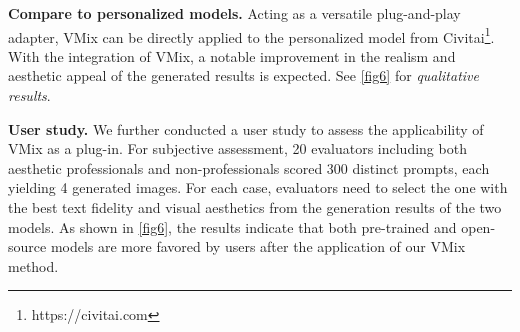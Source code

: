 \noindent \textbf{Compare to personalized models.} Acting as a versatile plug-and-play adapter, VMix can be directly applied to the personalized model from Civitai\footnote{https://civitai.com}. With the integration of VMix, a notable improvement in the realism and aesthetic appeal of the generated results is expected. See \cref{fig6} for \textit{qualitative results}.

\noindent \textbf{User study.} We further conducted a user study to assess the applicability of VMix as a plug-in. For subjective assessment, 20 evaluators including both aesthetic professionals and non-professionals scored 300 distinct prompts, each yielding 4 generated images. For each case, evaluators need to select the one with the best text fidelity and visual aesthetics from the generation results of the two models. As shown in \cref{fig6}, the results indicate that both pre-trained and open-source models are more favored by users after the application of our VMix method. 

\begin{table}[t]
\centering
{}
\caption{Quantitative results on MJHQ-30K benchmark~\cite{li2024playground}. $\uparrow$ stands for higher the better, $\downarrow$ stands for lower the better.}
\label{tab1}
\end{table}

